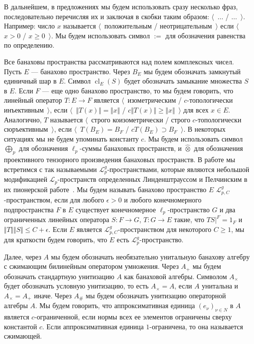 \documentclass[12pt]{article}
\newcommand{\projtens}{\mathbin{\widehat{\otimes}}}
\begin{document}
В дальнейшем, в предложениях мы будем использовать сразу несколько фраз,
последовательно перечисляя их и заключая в скобки таким образом:
$\langle$~$\ldots$ / $\ldots$~$\rangle$. Например: число $x$ называется
$\langle$~положительным / неотрицательным~$\rangle$ если $\langle$~$x>0$ /
$x\geq 0$~$\rangle$. Мы будем использовать символ $:=$ для обозначения равенства
по определению.

Все банаховы пространства рассматриваются над полем комплексных чисел. Пусть $E$
--- банахово пространство. Через $B_E$ мы будем обозначать замкнутый единичный
шар в $E$. Символ $\operatorname{cl}_E(S)$ будет обозначать замыкание множества
$S$ в $E$. Если $F$ --- еще одно банахово пространство, то мы будем говорить,
что линейный оператор $T:E\to F$ является $\langle$~изометрическим /
$c$-топологически инъективным~$\rangle$, если $\langle$~$\Vert T(x)\Vert=\Vert
x\Vert$ / $c\Vert T(x)\Vert\geq\Vert x\Vert$~$\rangle$ для всех $x\in E$.
Аналогично, $T$ называется $\langle$~строго коизометрически / строго
$c$-топологически сюръективным~$\rangle$, если $\langle$~$T(B_E)=B_F$ / $c
T(B_E)\supset B_F$~$\rangle$. В некоторых ситуациях мы не будем упоминать
константу $c$. Мы будем использовать символ $\bigoplus_p$ для обозначения
$\ell_p$-суммы банаховых пространств, и $\projtens$ для обозначения проективного
тензорного произведения банаховых пространств. В работе мы встретимся с так
называемыми $\mathcal{L}_p^g$-пространствами, которые являются небольшой
модификацией $\mathcal{L}_p$-пространств определенных Линденштрауссом и
Пелчинским в их пионерской работе~\cite{LinPelAbsSumOpInLpSpAndApp}. Мы будем
называть банахово пространство $E$  $\mathcal{L}_{p,C}^g$-пространством, если
для любого $\epsilon>0$ и любого конечномерного подпространства $F$ в $E$
существует конечномерное $\ell_p$-пространство $G$ и два ограниченных линейных
оператора $S:F\to G$, $T:G\to E$ такие, что $TS|^F=1_F$ и $\Vert T\Vert\Vert
S\Vert\leq C+\epsilon$. Если $E$ является $\mathcal{L}_{p,C}^g$-пространством
для некоторого $C\geq 1$, мы для краткости будем говорить, что $E$ есть
$\mathcal{L}_p^g$-пространство.

Далее, через $A$ мы будем обозначать необязательно унитальную банахову алгебру с
сжимающим билинейным оператором умножения. Через $A_+$ мы будем обозначать
стандартную унитизацию $A$ как банаховой алгебры. Символом $A_\times$ будет
обозначать условную унитизацию, то есть $A_\times=A$, если $A$ унитальна и
$A_\times=A_+$ иначе. Через $A_\#$ мы будем обозначать унитизацию операторной
алгебры $A$. Мы будем говорить, что аппроксимативная единица ${(e_\nu)}_{\nu\in
N}$ в $A$ является $c$-ограниченной, если нормы всех ее элементов ограничены
сверху константой $c$. Если аппроксимативная единица $1$-ограничена, то она
называется сжимающей. 
\end{document}

